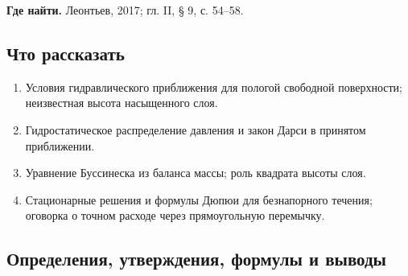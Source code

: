 \documentclass[12pt,a4paper]{article}
\begin{document}
\medskip
\textbf{Где найти.} Леонтьев, 2017; гл. II, § 9, с. 54--58.

\subsection*{Что рассказать}
\begin{enumerate}
\item Условия гидравлического приближения для пологой свободной поверхности; неизвестная высота насыщенного слоя.
\item Гидростатическое распределение давления и закон Дарси в принятом приближении.
\item Уравнение Буссинеска из баланса массы; роль квадрата высоты слоя.
\item Стационарные решения и формулы Дюпюи для безнапорного течения; оговорка о точном расходе через прямоугольную перемычку.
\end{enumerate}
\subsection*{Определения, утверждения, формулы и выводы}
\begingroup
\end{document}

